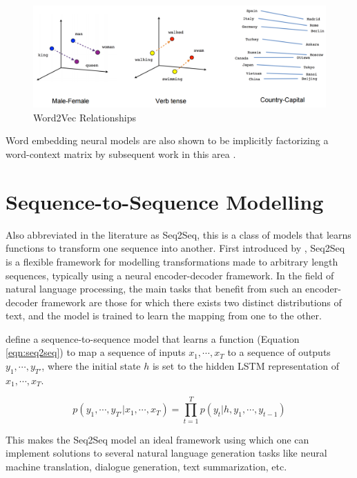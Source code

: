 \begin{figure}[ht]
	\centering
	\includegraphics[width=\textwidth]{images/word2vec-linear-relationships}
	\caption{\label{fig:word2vec-linear-relationships} Word2Vec Relationships}
\end{figure}

Word embedding neural models are also shown to be implicitly factorizing a word-context matrix by subsequent work in this area \citep{levy2014neural}.


\section{Sequence-to-Sequence Modelling}

Also abbreviated in the literature as Seq2Seq, this is a class of models that learns functions to transform one sequence into another. First introduced by \cite{sutskever2014sequence}, Seq2Seq is a flexible framework for modelling transformations made to arbitrary length sequences, typically using a neural encoder-decoder framework. In the field of natural language processing, the main tasks that benefit from such an encoder-decoder framework are those for which there exists two distinct distributions of text, and the model is trained to learn the mapping from one to the other.

\cite{sutskever2014sequence} define a sequence-to-sequence model that learns a function (Equation \ref{eqn:seq2seq}) to map a sequence of inputs $x_1, \cdots , x_T$ to a sequence of outputs $y_1, \cdots , y_{T'}$, where the initial state $h$ is set to the hidden LSTM representation of $x_1, \cdots , x_T$.

\begin{equation} \label{eqn:seq2seq}
	p(y_1, \cdots , y_{T'} | x_1, \cdots , x_T) =	\prod_{t=1}^T p(y_t | h, y_1, \cdots , y_{t-1})
\end{equation}

This makes the Seq2Seq model an ideal framework using which one can implement solutions to several natural language generation tasks like neural machine translation, dialogue generation, text summarization, etc.

